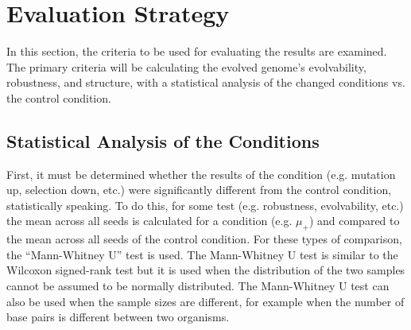 \section{Evaluation Strategy}
In this section, the criteria to be used for evaluating the results are examined. The primary criteria will be calculating the evolved genome's evolvability, robustness, and structure, with a statistical analysis of the changed conditions vs. the control condition. 

\subsection{Statistical Analysis of the Conditions}
First, it must be determined whether the results of the condition (e.g. mutation up, selection down, etc.) were significantly different from the control condition, statistically speaking. To do this, for some test (e.g. robustness, evolvability, etc.) the mean across all seeds is calculated for a condition (e.g. $\mu_+$) and compared to the mean across all seeds of the control condition. For these types of comparison, the ``Mann-Whitney U'' test is used. The Mann-Whitney U test is similar to the Wilcoxon signed-rank test but it is used when the distribution of the two samples cannot be assumed to be normally distributed. The Mann-Whitney U test can also be used when the sample sizes are different, for example when the number of base pairs is different between two organisms.

